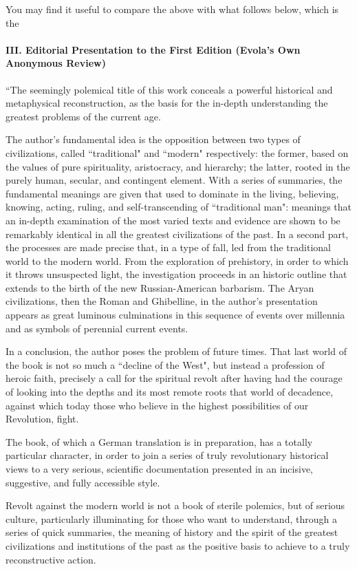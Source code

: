 You may find it useful to compare the above with what follows below, which is the

\paragraph{III. Editorial Presentation to the First Edition (Evola's Own Anonymous Review)}
``The seemingly polemical title of this work conceals a powerful historical and metaphysical reconstruction, as the basis for the in-depth understanding the greatest problems of the current age.

The author's fundamental idea is the opposition between two types of civilizations, called ``traditional" and ``modern" respectively: the former, based on the values of pure spirituality, aristocracy, and hierarchy; the latter, rooted in the purely human, secular, and contingent element. With a series of summaries, the fundamental meanings are given that used to dominate in the living, believing, knowing, acting, ruling, and self-transcending of ``traditional man": meanings that an in-depth examination of the most varied texts and evidence are shown to be remarkably identical in all the greatest civilizations of the past. In a second part, the processes are made precise that, in a type of fall, led from the traditional world to the modern world. From the exploration of prehistory, in order to which it throws unsuspected light, the investigation proceeds in an historic outline that extends to the birth of the new Russian-American barbarism. The Aryan civilizations, then the Roman and Ghibelline, in the author's presentation appears as great luminous culminations in this sequence of events over millennia and as symbols of perennial current events.

In a conclusion, the author poses the problem of future times. That last world of the book is not so much a ``decline of the West", but instead a profession of heroic faith, precisely a call for the spiritual revolt after having had the courage of looking into the depths and its most remote roots that world of decadence, against which today those who believe in the highest possibilities of our Revolution, fight.

The book, of which a German translation is in preparation, has a totally particular character, in order to join a series of truly revolutionary historical views to a very serious, scientific documentation presented in an incisive, suggestive, and fully accessible style.

Revolt against the modern world is not a book of sterile polemics, but of serious culture, particularly illuminating for those who want to understand, through a series of quick summaries, the meaning of history and the spirit of the greatest civilizations and institutions of the past as the positive basis to achieve to a truly reconstructive action.

